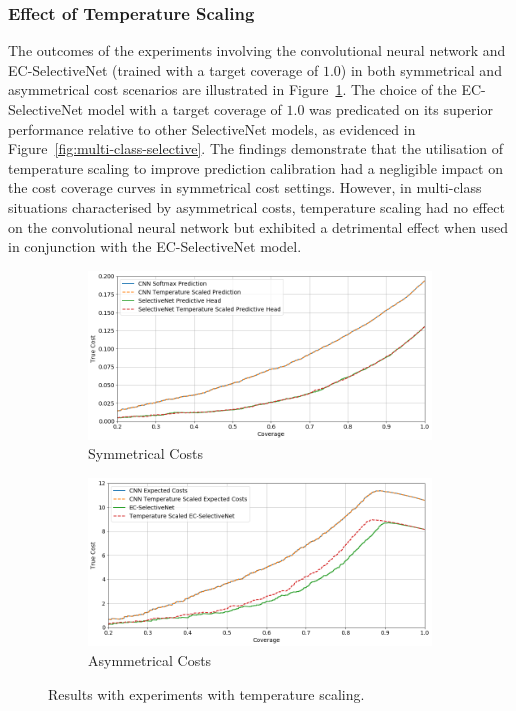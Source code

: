 \subsubsection{Effect of Temperature Scaling}
The outcomes of the experiments involving the convolutional neural network and EC-SelectiveNet (trained with a target coverage of $1.0$) in both symmetrical and asymmetrical cost scenarios are illustrated in Figure~\ref{fig:multi-class-temp}. The choice of the EC-SelectiveNet model with a target coverage of $1.0$ was predicated on its superior performance relative to other SelectiveNet models, as evidenced in Figure~\ref{fig:multi-class-selective}. The findings demonstrate that the utilisation of temperature scaling to improve prediction calibration had a negligible impact on the cost coverage curves in symmetrical cost settings. However, in multi-class situations characterised by asymmetrical costs, temperature scaling had no effect on the convolutional neural network but exhibited a detrimental effect when used in conjunction with the EC-SelectiveNet model.

\begin{figure}[!h]
	\centering
	\begin{subfigure}{\textwidth}
		\centering
		\includegraphics[width=\linewidth]{images/multi-class-temp-sym.png}
		\caption{Symmetrical Costs}	
	\end{subfigure}
	\begin{subfigure}{\textwidth}
		\centering
		\includegraphics[width=\linewidth]{images/multi-class-temp-asym.png}
		\caption{Asymmetrical Costs}
	\end{subfigure}
	\caption{Results with experiments with temperature scaling.}
	\label{fig:multi-class-temp}
\end{figure}

